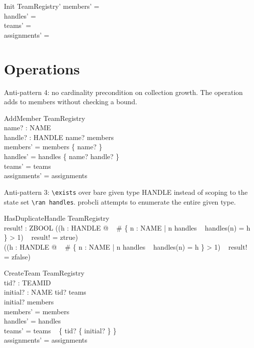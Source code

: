 \documentclass[a4paper,10pt,fleqn]{article}
\begin{document}
\begin{schema}{Init}
  TeamRegistry'
\where
  members' = \emptyset \\
  handles' = \emptyset \\
  teams' = \emptyset \\
  assignments' = \emptyset
\end{schema}

\section{Operations}

Anti-pattern 4: no cardinality precondition on collection
growth. The operation adds to members without checking a bound.

\begin{schema}{AddMember}
  \Delta TeamRegistry \\
  name? : NAME \\
  handle? : HANDLE
\where
  name? \notin members \\
  members' = members \cup \{ name? \} \\
  handles' = handles \cup \{ name? \mapsto handle? \} \\
  teams' = teams \\
  assignments' = assignments
\end{schema}

Anti-pattern 3: \verb|\exists| over bare given type HANDLE
instead of scoping to the state set \verb|\ran handles|.
probcli attempts to enumerate the entire given type.

\begin{schema}{HasDuplicateHandle}
  \Xi TeamRegistry \\
  result! : ZBOOL
\where
  ((\exists h : HANDLE @
\quad~ \# \{ n : NAME | n \in \dom handles
\quad~ \land handles(n) = h \} > 1)
\quad~ \land result! = ztrue) \\
  \lor (\lnot (\exists h : HANDLE @
\quad~ \# \{ n : NAME | n \in \dom handles
\quad~ \land handles(n) = h \} > 1)
\quad~ \land result! = zfalse)
\end{schema}

\begin{schema}{CreateTeam}
  \Delta TeamRegistry \\
  tid? : TEAMID \\
  initial? : NAME
\where
  tid? \notin \dom teams \\
  initial? \in members \\
  members' = members \\
  handles' = handles \\
  teams' = teams \cup
\quad~ \{ tid? \mapsto \{ initial? \} \} \\
  assignments' = assignments
\end{schema}
\end{document}
